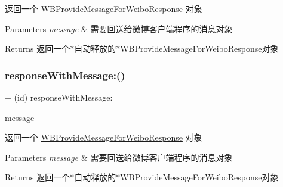 返回一个 \mbox{\hyperlink{interface_w_b_provide_message_for_weibo_response}{W\+B\+Provide\+Message\+For\+Weibo\+Response}} 对象 
\begin{DoxyParams}{Parameters}
{\em message} & 需要回送给微博客户端程序的消息对象 \\
\hline
\end{DoxyParams}
\begin{DoxyReturn}{Returns}
返回一个$\ast$自动释放的$\ast$\+W\+B\+Provide\+Message\+For\+Weibo\+Response对象 
\end{DoxyReturn}
\mbox{\label{interface_w_b_provide_message_for_weibo_response_afa9a83935ca374cd240bbe6194b6d0b0}} 
\subsubsection{\texorpdfstring{response\+With\+Message\+:()}{responseWithMessage:()}\hspace{0.1cm}{\footnotesize\ttfamily [2/3]}}
{\footnotesize\ttfamily + (id) response\+With\+Message\+: \begin{DoxyParamCaption}\item[{(\mbox{\hyperlink{interface_w_b_message_object}{W\+B\+Message\+Object}} $\ast$)}]{message }\end{DoxyParamCaption}}

返回一个 \mbox{\hyperlink{interface_w_b_provide_message_for_weibo_response}{W\+B\+Provide\+Message\+For\+Weibo\+Response}} 对象 
\begin{DoxyParams}{Parameters}
{\em message} & 需要回送给微博客户端程序的消息对象 \\
\hline
\end{DoxyParams}
\begin{DoxyReturn}{Returns}
返回一个$\ast$自动释放的$\ast$\+W\+B\+Provide\+Message\+For\+Weibo\+Response对象 
\end{DoxyReturn}
\mbox{\label{interface_w_b_provide_message_for_weibo_response_afa9a83935ca374cd240bbe6194b6d0b0}} 
